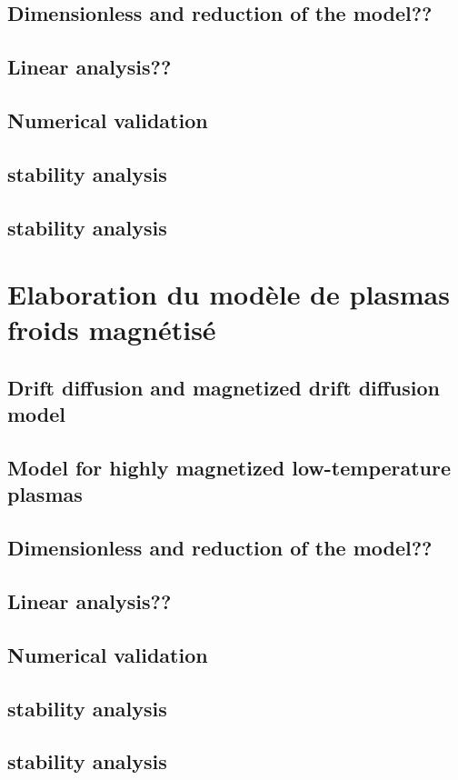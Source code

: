 		\subsection{Dimensionless and reduction of the model??}
		\subsection{Linear analysis??}
		\subsection{Numerical validation}
		\subsection{stability analysis}
		\subsection{stability analysis}
	\section{Elaboration du modèle de plasmas froids magnétisé}
		\subsection{Drift diffusion and magnetized drift diffusion model}
		\subsection{Model for highly magnetized low-temperature plasmas}
		\subsection{Dimensionless and reduction of the model??}
		\subsection{Linear analysis??}
		\subsection{Numerical validation}
		\subsection{stability analysis}
		\subsection{stability analysis}
